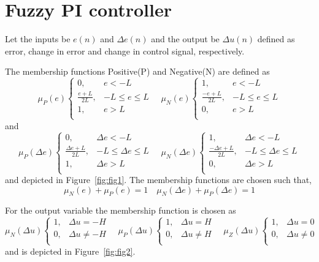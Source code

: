 \section{Fuzzy PI controller}
Let the inputs be $e(n)$ and $\Delta e(n)$ and the output be $\Delta u(n)$ defined as error, change in error and change in control signal, respectively. 

The membership functions Positive(P) and Negative(N) are defined as 
\begin{equation}
    \mu_P(e)\begin{cases}
        0,& e<-L\\
        \frac{e+L}{2L},& -L\leq e\leq L\\
        1,& e>L\\
    \end{cases}\quad
    \mu_N(e)\begin{cases}
        1,& e<-L\\
        \frac{-e+L}{2L},& -L\leq e\leq L\\
        0,& e>L\\
    \end{cases}
\end{equation}
and 
\begin{equation}
    \mu_P(\Delta e)\begin{cases}
        0,& \Delta e<-L\\
        \frac{\Delta e+L}{2L},& -L\leq \Delta e\leq L\\
        1,& \Delta e>L\\
    \end{cases}\quad
    \mu_N(\Delta e)\begin{cases}
        1,& \Delta e<-L\\
        \frac{-\Delta e+L}{2L},& -L\leq \Delta e\leq L\\
        0,& \Delta e>L\\
    \end{cases}
\end{equation}
and depicted in Figure~\ref{fig:fig1}. The membership functions are chosen such that, 
\begin{equation}
    \mu_N(e)+\mu_P(e)=1\quad \mu_N(\Delta e)+\mu_P(\Delta e)=1
\end{equation}

For the output variable the membership function is chosen as
\begin{equation}
    \mu_N(\Delta u)\begin{cases}
        1,& \Delta u=-H\\
        0,& \Delta u\neq-H\\
    \end{cases}\quad
    \mu_P(\Delta u)\begin{cases}
        1,& \Delta u=H\\
        0,& \Delta u\neq H\\
    \end{cases}\quad
    \mu_Z(\Delta u)\begin{cases}
        1,& \Delta u=0\\
        0,& \Delta u\neq 0\\
    \end{cases}
\end{equation}
and is depicted in Figure~\ref{fig:fig2}.


